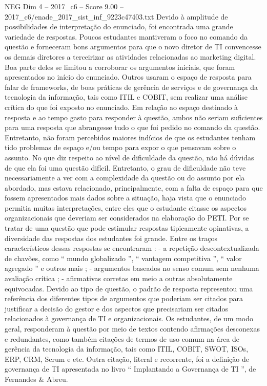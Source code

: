\begin{textsample}{NEG Dim 4 – 2017\_c6 – Score 9.00 – 2017\_c6/enade\_2017\_sist\_inf\_9223c47403.txt}
Devido à amplitude de possibilidades de interpretação do enunciado, foi encontrada uma grande variedade de respostas.
Poucos estudantes mantiveram o foco no comando da questão e forneceram bons argumentos para que o novo diretor de TI convencesse os demais diretores a terceirizar as atividades relacionadas ao marketing digital.
Boa parte deles se limitou a corroborar os argumentos iniciais, que foram apresentados no início do enunciado.
Outros usaram o espaço de resposta para falar de frameworks, de boas práticas de gerência de serviços e de governança da tecnologia da informação, tais como ITIL e COBIT, sem realizar uma análise crítica do que foi exposto no enunciado.
Em relação ao espaço destinado à resposta e ao tempo gasto para responder à questão, ambos não seriam suficientes para uma resposta que abrangesse tudo o que foi pedido no comando da questão.
Entretanto, não foram percebidos maiores indícios de que os estudantes tenham tido problemas de espaço e/ou tempo para expor o que pensavam sobre o assunto.
No que diz respeito ao nível de dificuldade da questão, não há dúvidas de que ela foi uma questão difícil.
Entretanto, o grau de dificuldade não teve necessariamente a ver com a complexidade da questão ou do assunto por ela abordado, mas estava relacionado, principalmente, com a falta de espaço para que fossem apresentados mais dados sobre a situação, haja vista que o enunciado permitia muitas interpretações, entre eles que o estudante citasse os aspectos organizacionais que deveriam ser considerados na elaboração do PETI.
Por se tratar de uma questão que pode estimular respostas tipicamente opinativas, a diversidade das respostas dos estudantes foi grande.
Entre os traços característicos dessas respostas se encontraram : - a repetição descontextualizada de chavões, como “ mundo globalizado ”, “ vantagem competitiva ”, “ valor agregado ” e outros mais ; - argumentos baseados no senso comum sem nenhuma avaliação crítica ; - afirmativas corretas em meio a outras absolutamente equivocadas.
Devido ao tipo de questão, o padrão de resposta representou uma referência dos diferentes tipos de argumentos que poderiam ser citados para justificar a decisão do gestor e dos aspectos que precisariam ser citados relacionados à governança de TI e organizacionais.
Os estudantes, de um modo geral, responderam à questão por meio de textos contendo afirmações desconexas e redundantes, como também citações de termos de uso comum na área de gerência da tecnologia da informação, tais como ITIL, COBIT, SWOT, ISOs, ERP, CRM, Scrum e etc.
Outra citação, literal e recorrente, foi a definição de governança de TI apresentada no livro “ Implantando a Governança de TI ”, de Fernandes \& Abreu.

\end{textsample}
